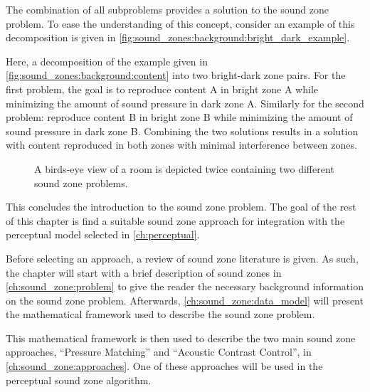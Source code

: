 The combination of all subproblems provides a solution to the sound zone problem. 
To ease the understanding of this concept, consider an example of this decomposition is given in 
\autoref{fig:sound_zones:background:bright_dark_example}.

Here, a decomposition of the example given in \autoref{fig:sound_zones:background:content} into 
two bright-dark zone pairs.
For the first problem, the goal is to reproduce content A in bright zone A while minimizing 
the amount of sound pressure in dark zone A.
Similarly for the second problem: reproduce content B in bright zone B while minimizing the 
amount of sound pressure in dark zone B.
Combining the two solutions results in a solution with content reproduced in both zones with 
minimal interference between zones.

\begin{figure}[]
    \centering
    \begin{subfigure}{0.49\linewidth}
        \centering
        \scalebox{0.9}{}
    \end{subfigure}
    \begin{subfigure}{0.49\linewidth}
        \centering
        \scalebox{0.9}{}
    \end{subfigure}
    \caption{A birds-eye view of a room is depicted twice containing two different sound zone problems.}
    \label{fig:sound_zones:background:bright_dark_example}
\end{figure}

This concludes the introduction to the sound zone problem.
The goal of the rest of this chapter is find a suitable sound zone approach 
for integration with the perceptual model selected in \autoref{ch:perceptual}.

Before selecting an approach, a review of sound zone literature is given.
As such, the chapter will start with a brief description of sound zones in \autoref{ch:sound_zone:problem} to give the reader 
the necessary background information on the sound zone problem.
Afterwards, \autoref{ch:sound_zone:data_model} will present the mathematical framework  
used to describe the sound zone problem.

This mathematical framework is then used to describe the two main sound zone approaches, ``Pressure Matching'' and ``Acoustic Contrast Control'', 
in \autoref{ch:sound_zone:approaches}.
One of these approaches will be used in the perceptual sound zone algorithm.

